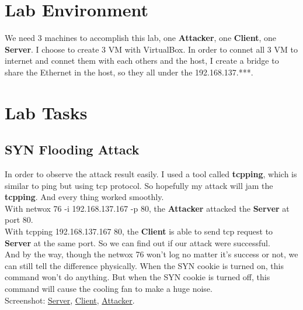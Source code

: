 \documentclass{article}
\newcommand{\code}[1]{{\ttfamily #1}}
\begin{document}
\maketitle
\section{Lab Environment}
We need 3 machines to accomplish this lab, one \textbf{Attacker}, one \textbf{Client}, one \textbf{Server}. I choose to create 3 VM with VirtualBox. In order to connet all 3 VM to internet and connet them with each others and the host, I create a bridge to share the Ethernet in the host, so they all under the 192.168.137.***.
\section{Lab Tasks}

\subsection{SYN Flooding Attack}
In order to observe the attack result easily. I used a tool called \textbf{tcpping}, which is similar to ping but using tcp protocol. So hopefully my attack will jam the \textbf{tcpping}. And every thing worked smoothly.\\
With \code{netwox 76 -i 192.168.137.167 -p 80}, the \textbf{Attacker} attacked the \textbf{Server} at port 80.\\
With \code{tcpping 192.168.137.167 80}, the \textbf{Client} is able to send tcp request to \textbf{Server} at the same port. So we can find out if our attack were successful.\\
And by the way, though the \code{netwox 76} won't log no matter it's success or not, we can still tell the difference physically. When the SYN cookie is turned on, this command won't do anything. But when the SYN cookie is turned off, this command will cause the cooling fan to make a huge noise.\\
Screenshot: 
\href{https://i.loli.net/2018/09/05/5b8f645f3315a.png}{Server},
\href{https://i.loli.net/2018/09/05/5b8f645f325cf.png}{Client},
\href{https://i.loli.net/2018/09/05/5b8f645f31ca2.png}{Attacker}.
\end{document}
